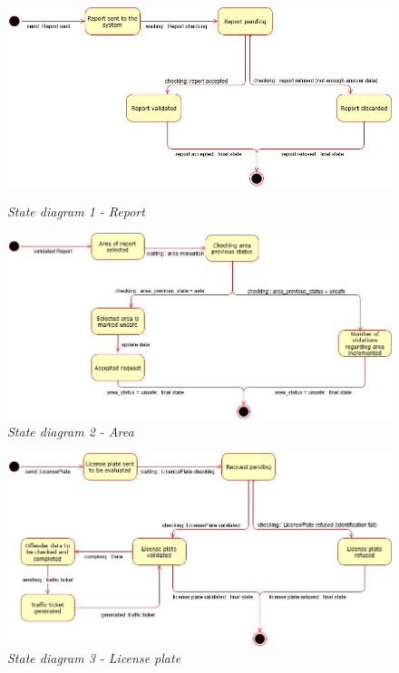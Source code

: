 \begin{figure}[ht!]
  \centering
  \includegraphics[width=\textwidth]{RASD_Images/StateDiagrams/state1.jpg}
  \caption{\textit{State diagram 1 - Report}}
  \centering
  \includegraphics[width=\textwidth]{RASD_Images/StateDiagrams/state2.jpg}
  \caption{\textit{State diagram 2 - Area}}
\end{figure}
\newpage

\begin{figure}[ht!]
  \centering
  \includegraphics[width=\textwidth]{RASD_Images/StateDiagrams/state3.jpg}
  \caption{\textit{State diagram 3 - License plate}}
\end{figure}
\newpage

